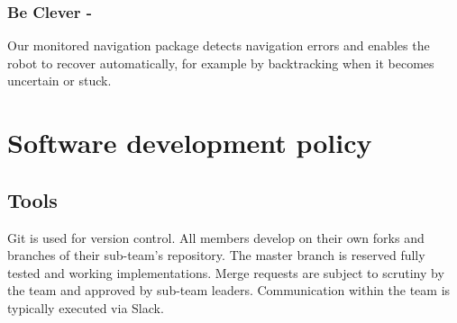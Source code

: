 \documentclass[runningheads,a4paper]{llncs}
\begin{document}
\subsubsection{Be Clever - }
Our monitored navigation package detects navigation errors and enables the robot to recover automatically, for example by backtracking when it becomes uncertain or stuck. 

\section{Software development policy}
\subsection{Tools}
Git is used for version control. All members develop on their own forks and branches of their sub-team's repository. The master branch is reserved fully tested and working implementations. Merge requests are subject to scrutiny by the team and approved by sub-team leaders. Communication within the team is typically executed via Slack.
\end{document}
